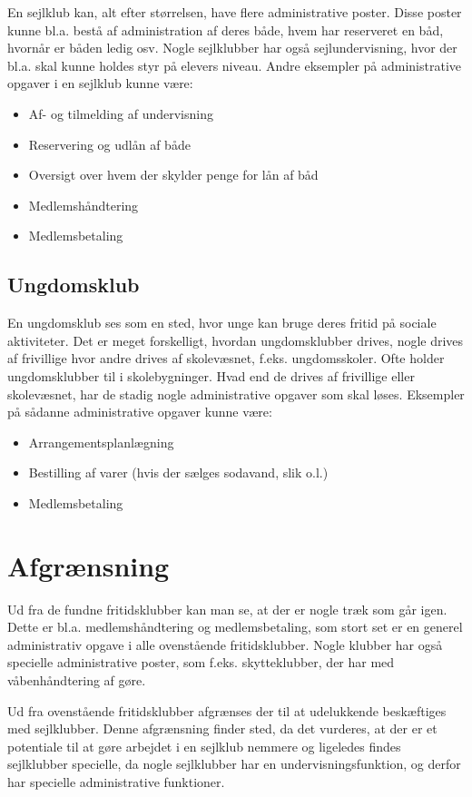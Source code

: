 En sejlklub kan, alt efter størrelsen, have flere administrative poster. Disse poster kunne bl.a. bestå af
administration af deres både, hvem har reserveret en båd, hvornår er båden ledig osv. Nogle sejlklubber har også
sejlundervisning, hvor der bl.a. skal kunne holdes styr på elevers niveau. Andre eksempler på administrative opgaver i
en sejlklub kunne være:

\begin{itemize}
\item Af- og tilmelding af undervisning
\item Reservering og udlån af både
\item Oversigt over hvem der skylder penge for lån af båd
\item Medlemshåndtering
\item Medlemsbetaling
\end{itemize}

\subsection{Ungdomsklub}

En ungdomsklub ses som en sted, hvor unge kan bruge deres fritid på sociale aktiviteter. Det er meget forskelligt,
hvordan ungdomsklubber drives, nogle drives af frivillige hvor andre drives af skolevæsnet, f.eks. ungdomsskoler. Ofte
holder ungdomsklubber til i skolebygninger. Hvad end de drives af frivillige eller skolevæsnet, har de stadig nogle
administrative opgaver som skal løses. Eksempler på sådanne administrative opgaver kunne være:

\begin{itemize}
\item Arrangementsplanlægning
\item Bestilling af varer (hvis der sælges sodavand, slik o.l.)
\item Medlemsbetaling
\end{itemize}

\section{Afgrænsning}

Ud fra de fundne fritidsklubber kan man se, at der er nogle træk som går igen. Dette er bl.a. medlemshåndtering og
medlemsbetaling, som stort set er en generel administrativ opgave i alle ovenstående fritidsklubber. Nogle klubber har
også specielle administrative poster, som f.eks. skytteklubber, der har med våbenhåndtering af gøre.

Ud fra ovenstående fritidsklubber afgrænses der til at udelukkende beskæftiges med sejlklubber. Denne afgrænsning finder
sted, da det vurderes, at der er et potentiale til at gøre arbejdet i en sejlklub nemmere og ligeledes findes
sejlklubber specielle, da nogle sejlklubber har en undervisningsfunktion, og derfor har specielle administrative
funktioner.

